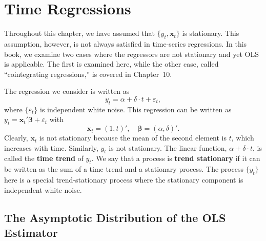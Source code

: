 
\section{Time Regressions}
\label{sec:2.12}

Throughout this chapter, we have assumed that $\{y_t, \mathbf{x}_t\}$ is stationary. This assumption, however, is not always satisfied in time-series regressions. In this book, we
examine two cases where the regressors are not stationary and yet OLS is applicable. The first is examined here, while the other case, called ``cointegrating regressions,'' is covered in Chapter~10.

The regression we consider is written as
%
\begin{equation}
y_t = \alpha + \delta \cdot t + \varepsilon_t,
\label{eq:2.12.1}
\end{equation}
%
where $\{\varepsilon_t\}$ is independent white noise. This regression can be written as
$y_t = \mathbf{x}_t'\bm{\beta} + \varepsilon_t$ with
%
\begin{equation}
\mathbf{x}_t = (1, t)', \quad \bm{\beta} = (\alpha, \delta)'.
\label{eq:2.12.2}
\end{equation}
%
Clearly, $\mathbf{x}_t$ is not stationary because the mean of the second element is $t$, which
increases with time. Similarly, $y_t$ is not stationary. The linear function,
$\alpha + \delta \cdot t$, is called the \textbf{time trend} of $y_t$. We say that a process is
\textbf{trend stationary} if it can be written as the sum of a time trend and a stationary
process. The process $\{y_t\}$ here is a special trend-stationary process where the
stationary component is independent white noise.

\subsection*{The Asymptotic Distribution of the OLS Estimator}

